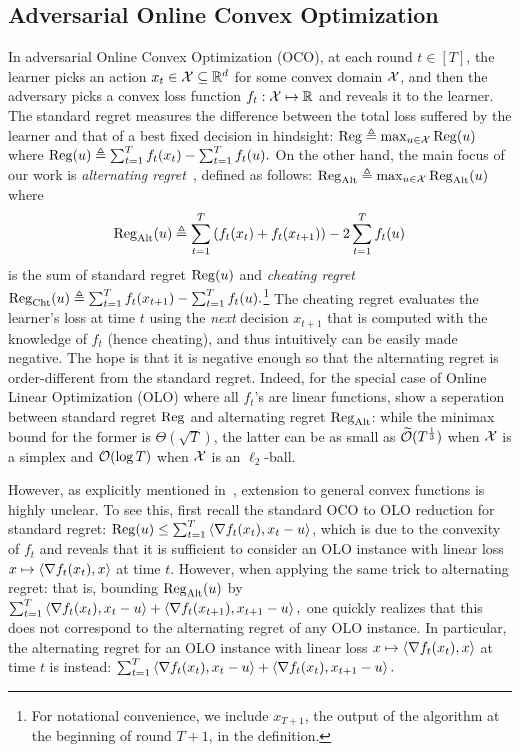 \subsection{Adversarial Online Convex Optimization}\label{sec:adv-oco}
In adversarial Online Convex Optimization (OCO), at each round $t\in[T]$, the learner picks an action $x_t\in{\mathcal{X}}\subseteq\mathbb{R}^d$ for some convex domain ${\mathcal{X}}$, and then the adversary picks a convex loss function $f_t: {\mathcal{X}} \mapsto \mathbb{R}$ and reveals it to the learner. The standard regret measures the difference between the total loss suffered by the learner and that of a best fixed decision in hindsight: ${\mathrm{Reg}} \triangleq \max_{u\in{\mathcal{X}}}{\mathrm{Reg}}(u)$ where
$
    {\mathrm{Reg}}(u) \triangleq \sum_{t=1}^Tf_t(x_t) - \sum_{t=1}^Tf_t(u).
$
On the other hand, the main focus of our work is \emph{alternating regret}~\citep{wibisono2022alternating, cevher2024alternation}, defined as follows: $\mathrm{Reg}_{\mathrm{Alt}} \triangleq \max_{u\in{\mathcal{X}}}\mathrm{Reg}_{\mathrm{Alt}}(u)$ where
\begin{align*}
    \mathrm{Reg}_{\mathrm{Alt}}(u) \triangleq \sum_{t=1}^T\left(f_t(x_t)+f_t(x_{t+1})\right) - 2\sum_{t=1}^Tf_t(u)
\end{align*}
is the sum of standard regret ${\mathrm{Reg}}(u)$ and \emph{cheating regret}
$
{\mathrm{Reg}_{\mathrm{Cht}}}(u) \triangleq \sum_{t=1}^T f_t(x_{t+1}) - \sum_{t=1}^Tf_t(u).
$\footnote{For notational convenience, we include $x_{T+1}$, the output of the algorithm at the beginning of round $T+1$, in the definition.}
The cheating regret evaluates the learner's loss at time $t$ using the \emph{next} decision $x_{t+1}$ that is computed with the knowledge of $f_t$ (hence cheating),
and thus intuitively can be easily made negative.
The hope is that it is negative enough so that the alternating regret is order-different from the standard regret.
%
Indeed, for the special case of Online Linear Optimization (OLO) where all $f_t$'s are linear functions, \citet{cevher2024alternation} show a seperation between standard regret ${\mathrm{Reg}}$ and alternating regret $\mathrm{Reg}_{\mathrm{Alt}}$:
while the minimax bound for the former is $\Theta(\sqrt{T})$,
the latter can be as small as $\widetilde{\mathcal{O}}(T^{\frac{1}{3}})$ when ${\mathcal{X}}$ is a simplex and $\mathcal{O}(\log T)$ when ${\mathcal{X}}$ is an $\ell_2$-ball.

However, as explicitly mentioned in~\citet{cevher2024alternation}, extension to general convex functions is highly unclear.
To see this, first recall the standard OCO to OLO reduction for standard regret:
${\mathrm{Reg}}(u) \leq \sum_{t=1}^T \left\langle {\nabla f_t(x_t), x_t-u} \right\rangle$, which is due to the convexity of $f_t$ and reveals that it is sufficient to consider an OLO instance with linear loss $x\mapsto\left\langle {\nabla f_t(x_t), x} \right\rangle$ at time $t$.
However, when applying the same trick to alternating regret: that is, bounding $\mathrm{Reg}_{\mathrm{Alt}}(u)$ by
$
 \sum_{t=1}^T \left\langle {\nabla f_t(x_t), x_t-u} \right\rangle + \left\langle {\nabla f_t(x_{t+1}), x_{t+1}-u} \right\rangle,
$
one quickly realizes that this does not correspond to the alternating regret of any OLO instance.
In particular, the alternating regret for an OLO instance with linear loss $x\mapsto\left\langle {\nabla f_t(x_t), x} \right\rangle$ at time $t$ is instead: 
$
 \sum_{t=1}^T \left\langle {\nabla f_t(x_t), x_t-u} \right\rangle + \left\langle {\nabla f_t(x_{t}), x_{t+1}-u} \right\rangle.
$

